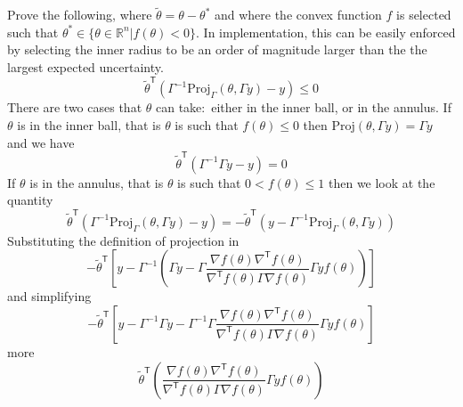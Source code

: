 
Prove the following, where $\tilde{\theta}=\theta-\theta^{*}$ and where the convex function $f$ is selected such that $\theta^{*}\in\{\theta\in\mathbb{R}^{n}|f(\theta)<0\}$.
In implementation, this can be easily enforced by selecting the inner radius to be an order of magnitude larger than the the largest expected uncertainty.
\begin{equation*}
  \tilde{\theta}^{\mathsf{T}}\left(\Gamma^{-1}\text{Proj}_{\Gamma}(\theta,\Gamma y)-y\right)\leq0
\end{equation*}
There are two cases that $\theta$ can take:\ either in the inner ball, or in the annulus.
If $\theta$ is in the inner ball, that is $\theta$ is such that $f(\theta)\leq0$ then $\text{Proj}(\theta,\Gamma y)=\Gamma y$ and we have
\begin{equation*}
  \tilde{\theta}^{\mathsf{T}}\left(\Gamma^{-1}\Gamma y-y\right)=0
\end{equation*}
If $\theta$ is in the annulus, that is $\theta$ is such that $0<f(\theta)\leq1$ then we look at the quantity
\begin{equation*}
  \tilde{\theta}^{\mathsf{T}}\left(\Gamma^{-1}\text{Proj}_{\Gamma}(\theta,\Gamma y)-y\right)=
  -\tilde{\theta}^{\mathsf{T}}\left(y-\Gamma^{-1}\text{Proj}_{\Gamma}(\theta,\Gamma y)\right)
\end{equation*}
Substituting the definition of projection in
\begin{equation*}
  -\tilde{\theta}^{\mathsf{T}}\left[y-\Gamma^{-1}\left(\Gamma y- \Gamma \frac{\nabla f(\theta){\nabla}^{\mathsf{T}}f(\theta)}{\nabla^{\mathsf{T}}f(\theta)\Gamma \nabla f(\theta)}\Gamma yf(\theta)\right)\right]
\end{equation*}
and simplifying
\begin{equation*}
  -\tilde{\theta}^{\mathsf{T}}\left[y-\Gamma^{-1}\Gamma y-\Gamma^{-1}\Gamma \frac{\nabla f(\theta){\nabla}^{\mathsf{T}}f(\theta)}{\nabla^{\mathsf{T}}f(\theta)\Gamma \nabla f(\theta)}\Gamma yf(\theta)\right]
\end{equation*}
more
\begin{equation*}
  \tilde{\theta}^{\mathsf{T}}\left(\frac{\nabla f(\theta){\nabla}^{\mathsf{T}}f(\theta)}{\nabla^{\mathsf{T}}f(\theta)\Gamma \nabla f(\theta)}\Gamma yf(\theta)\right)
\end{equation*}

